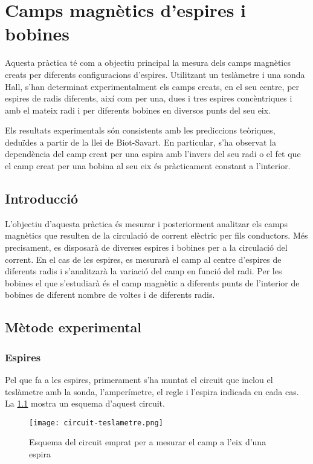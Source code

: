 \chapter{Camps magnètics d'espires i bobines}
\begin{resum}
Aquesta pràctica té com a objectiu principal la mesura dels camps magnètics creats per diferents configuracions d'espires. Utilitzant un teslàmetre i una sonda Hall, s'han determinat experimentalment els camps creats, en el seu centre, per espires de radis diferents, així com per una, dues i tres espires concèntriques i amb el mateix radi i per diferents bobines en diversos punts del seu eix.

	Els resultats experimentals són consistents amb les prediccions teòriques, deduïdes a partir de la llei de Biot-Savart. En particular, s'ha observat la dependència del camp creat per una espira amb l'invers del seu radi o el fet que el camp creat per una bobina al seu eix és pràcticament constant a l'interior.
\end{resum}

\section{Introducció}
L'objectiu d'aquesta pràctica és mesurar i posteriorment analitzar els camps magnètics que resulten de la circulació de corrent elèctric per fils conductors. Més precisament, es disposarà de diverses espires i bobines per a la circulació del corrent. En el cas de les espires, es mesurarà el camp al centre d'espires de diferents radis i s'analitzarà la variació del camp en funció del radi. Per les bobines el que s'estudiarà és el camp magnètic a diferents punts de l'interior de bobines de diferent nombre de voltes i de diferents radis.

\section{Mètode experimental}

\subsection{Espires}
Pel que fa a les espires, primerament s'ha muntat el circuit que inclou el teslàmetre amb la sonda, l'amperímetre, el regle i l'espira indicada en cada cas. La \cref{fig:circuit teslametre} mostra un esquema d'aquest circuit.

\begin{figure}[htb]
  \centering \small \sffamily
  \texttt{[image: circuit-teslametre.png]}
  \caption{Esquema del circuit emprat per a mesurar el camp a l'eix d'una espira}
  \label{fig:circuit teslametre}
\end{figure}

